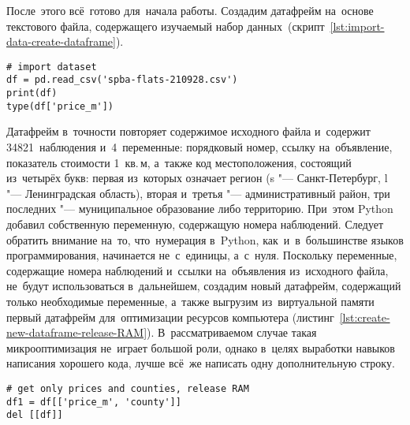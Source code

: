 \documentclass[]{scrartcl}
\begin{document}
После~этого всё~готово для~начала работы. Создадим датафрейм на~основе текстового файла, содержащего изучаемый набор данных~(скрипт~\ref{lst:import-data-create-dataframe}).
%
\begin{lstlisting}[float, caption = Загрузка данных и~создание датафрейма, firstnumber=1, label= lst:import-data-create-dataframe]
# import dataset
df = pd.read_csv('spba-flats-210928.csv')
print(df)
type(df['price_m'])
\end{lstlisting}
%
Датафрейм в~точности повторяет содержимое исходного файла и~содержит 34821~наблюдения и~4~переменные: порядковый номер, ссылку на~объявление, показатель стоимости 1~кв.\,м, а~также код местоположения, состоящий из~четырёх букв: первая из~которых означает регион (s "--- Санкт-Петербург, l "--- Ленинградская область), вторая и~третья "--- административный район, три последних "--- муниципальное образование либо территорию. При~этом \foreignlanguage{english}{Python} добавил собственную переменную, содержащую номера наблюдений. Следует обратить внимание на~то, что~нумерация в~\foreignlanguage{english}{Python}, как~и~в~большинстве языков программирования, начинается не~с~единицы, а~с~нуля. Поскольку переменные, содержащие номера наблюдений и~ссылки на~объявления из~исходного файла, не~будут использоваться в~дальнейшем, создадим новый датафрейм, содержащий только необходимые переменные, а~также выгрузим из~виртуальной памяти первый датафрейм для~оптимизации ресурсов компьютера (листинг~\ref{lst:create-new-dataframe-release-RAM}). В~рассматриваемом случае такая микрооптимизация не~играет большой роли, однако в~целях выработки навыков написания хорошего кода, лучше всё~же написать одну дополнительную строку.
%
\begin{lstlisting}[float, caption = Создание датафрейма\, содержащего только необходимые переменные\, и~выгрузка из~памяти неиспользуемых данных, firstnumber=1, label= lst:create-new-dataframe-release-RAM]
# get only prices and counties, release RAM
df1 = df[['price_m', 'county']]
del [[df]]
\end{lstlisting}
%
\end{document}
